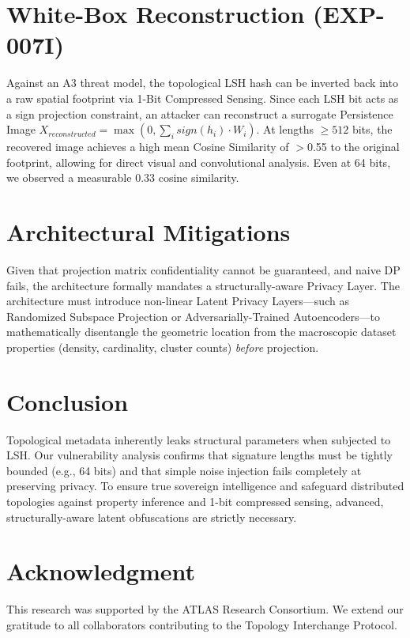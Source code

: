 \documentclass[10pt, conference]{IEEEtran}
\begin{document}
\section{White-Box Reconstruction (EXP-007I)}
Against an A3 threat model, the topological LSH hash can be inverted back into a raw spatial footprint via 1-Bit Compressed Sensing. Since each LSH bit acts as a sign projection constraint, an attacker can reconstruct a surrogate Persistence Image $X_{reconstructed} = \max(0, \sum_{i} sign(h_i) \cdot W_i)$.
At lengths $\ge 512$ bits, the recovered image achieves a high mean Cosine Similarity of $>$0.55 to the original footprint, allowing for direct visual and convolutional analysis. Even at 64 bits, we observed a measurable 0.33 cosine similarity.

\section{Architectural Mitigations}
Given that projection matrix confidentiality cannot be guaranteed, and naive DP fails, the architecture formally mandates a structurally-aware Privacy Layer. The architecture must introduce non-linear Latent Privacy Layers—such as Randomized Subspace Projection or Adversarially-Trained Autoencoders—to mathematically disentangle the geometric location from the macroscopic dataset properties (density, cardinality, cluster counts) \textit{before} projection.

\section{Conclusion}
Topological metadata inherently leaks structural parameters when subjected to LSH. Our vulnerability analysis confirms that signature lengths must be tightly bounded (e.g., 64 bits) and that simple noise injection fails completely at preserving privacy. To ensure true sovereign intelligence and safeguard distributed topologies against property inference and 1-bit compressed sensing, advanced, structurally-aware latent obfuscations are strictly necessary.

\section*{Acknowledgment}
This research was supported by the ATLAS Research Consortium. We extend our gratitude to all collaborators contributing to the Topology Interchange Protocol.



\end{document}
